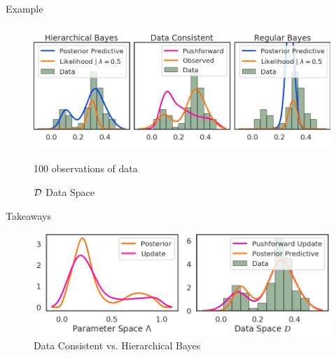\begin{block}{Example}
\vspace{-1.5cm}

\begin{figure}
        \includegraphics[width=32cm]{figures/distr_EX_data_space.png}
        \vspace{-1cm}
        \centering
        \caption{100 observations of data}
        \vspace{-1cm}
        \caption{\large $\mathcal{D}$ Data Space  }
\end{figure}


\end{block}

\vspace{-1.5cm}

\begin{block}{Takeaways}

\centering
\vspace{-0.5cm}
\begin{figure}
        \includegraphics[width=32cm]{figures/distr_EX_comparison.png}
        \vspace{-1cm} 
        \caption{\centering Data Consistent vs. Hierarchical Bayes}
    \end{figure}
\end{block}
